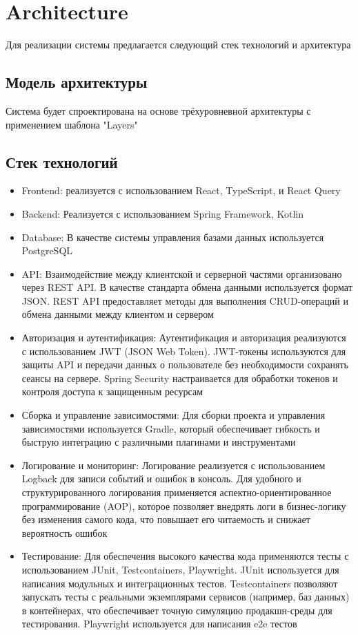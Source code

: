 \section{Architecture}
Для реализации системы предлагается следующий стек технологий и архитектура

\subsection{Модель архитектуры}
 Система будет спроектирована на основе трёхуровневной архитектуры с применением шаблона "Layers"
\subsection{Стек технологий}
\begin{itemize}
    \item Frontend: реализуется с использованием React, TypeScript, и React Query
    \item Backend: Реализуется с использованием Spring Framework, Kotlin
    \item Database: В качестве системы управления базами данных используется PostgreSQL    
    \item API: Взаимодействие между клиентской и серверной частями организовано через REST API. В качестве стандарта обмена данными используется формат JSON. REST API предоставляет методы для выполнения CRUD-операций и обмена данными между клиентом и сервером
    \item Авторизация и аутентификация: Аутентификация и авторизация реализуются с использованием JWT (JSON Web Token). JWT-токены используются для защиты API и передачи данных о пользователе без необходимости сохранять сеансы на сервере. Spring Security настраивается для обработки токенов и контроля доступа к защищенным ресурсам
    \item Сборка и управление зависимостями: Для сборки проекта и управления зависимостями используется Gradle, который обеспечивает гибкость и быструю интеграцию с различными плагинами и инструментами
    \item Логирование и мониторинг: Логирование реализуется с использованием Logback для записи событий и ошибок в консоль. Для удобного и структурированного логирования применяется аспектно-ориентированное программирование (AOP), которое позволяет внедрять логи в бизнес-логику без изменения самого кода, что повышает его читаемость и снижает вероятность ошибок
    \item Тестирование: Для обеспечения высокого качества кода применяются тесты с использованием JUnit, Testcontainers, Playwright. JUnit используется для написания модульных и интеграционных тестов. Testcontainers позволяют запускать тесты с реальными экземплярами сервисов (например, баз данных) в контейнерах, что обеспечивает точную симуляцию продакшн-среды для тестирования. Playwright используется для написания e2e тестов
\end{itemize}
